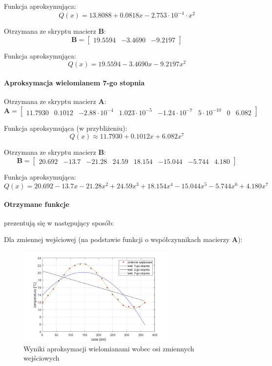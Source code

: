 \documentclass[a4paper, 12pt]{mwart}
\begin{document}
					Funkcja aproksymująca: 
					$$ Q(x) = 13.8088 + 0.0818x -2.753 \cdot 10^{-4} \cdot x^2 $$

					Otrzymana ze skryptu macierz $\textbf{B}$:
					$$\textbf{B} = \begin{bmatrix}
						19.5594 &
						-3.4690 &
						-9.2197
					\end{bmatrix}$$

					Funkcja aproksymująca:
					$$ Q(x) = 19.5594 -3.4690x -9.2197x^2$$

				\paragraph{Aproksymacja wielomianem 7-go stopnia}

					Otrzymana ze skryptu macierz $\textbf{A}$:
					$$\textbf{A} = \begin{bmatrix}
						11.7930 &
						0.1012 &
						-2.88\cdot 10^{-4} &
						1.023\cdot 10^{-5} &
						-1.24\cdot 10^{-7} &
						5 \cdot 10^{-10} &
						0 &
						6.082
					\end{bmatrix}$$

					Funkcja aproksymująca (w przybliżeniu):
					$$ Q(x) \approx 11.7930 + 0.1012x + 6.082 x^7 $$

					Otrzymana ze skryptu macierz $\textbf{B}$:
					$$\textbf{B} = \begin{bmatrix}
						20.692 &
						-13.7 &
						-21.28 &
						24.59 &
						18.154 &
						-15.044 &
						-5.744 &
						4.180
					\end{bmatrix}$$

					Funkcja aproksymująca:
					$$ Q(x) = 20.692 -13.7x -21.28x^2 + 24.59x^3 + 18.154x^4 - 15.044x^5 -5.744x^6 + 4.180x^7 $$

					\newpage
				\paragraph{Otrzymane funkcje} prezentują się w następujący sposób:

					Dla zmiennej wejściowej (na podstawie funkcji o współczynnikach macierzy $\textbf{A}$):
					\begin{figure}[h]
						\begin{center}
							\includegraphics[width = 0.7\textwidth]{graphs/3-n.jpg}
							\caption{Wyniki aproksymacji wielomianami wobec osi zmiennych wejściowych}
							\label{fig:3N}
						\end{center}
					\end{figure}
\end{document}
